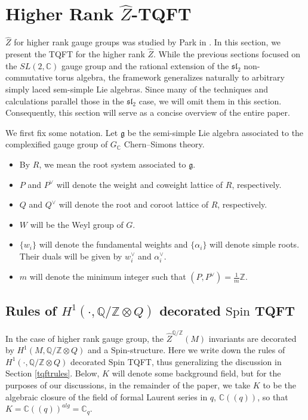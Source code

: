 \documentclass{article}
\newcommand{\Z}{{\mathbb Z}}
\newcommand{\C}{{\mathbb C}}
\newcommand{\Q}{{\mathbb Q}}
\numberwithin{corollary}{theorem}
\numberwithin{corollary}{proposition}
\begin{document}
\section{Higher Rank \texorpdfstring{$\hat{Z}$}{Z}-TQFT}
$\hat{Z}$ for higher rank gauge groups was studied by Park in \cite{P3}. In this section, we present the TQFT for the higher rank $\hat{Z}$. While the previous sections focused on the $SL(2,\C)$ gauge group and the rational extension of the $\mathfrak{sl}_2$ non-commutative torus algebra, the framework generalizes naturally to arbitrary simply laced sem-simple Lie algebras. Since many of the techniques and calculations parallel those in the $\mathfrak{sl}_{2}$ case, we will omit them in this section. Consequently, this section will serve as a concise overview of the entire paper. 

We first fix some notation. Let $\mathfrak{g}$ be the semi-simple Lie algebra associated to the complexified gauge group of $G_\mathbb{C}$ Chern--Simons theory. 
\begin{itemize}
    \item By $R$, we mean the root system associated to $\mathfrak{g}$.
    \item $P$ and $P^\vee$ will denote the weight and coweight lattice of $R$, respectively. 
    \item $Q$ and $Q^\vee$ will denote the root and coroot lattice of $R$, respectively.
    \item $W$ will be the Weyl group of $G$. 
    \item $\{w_i\}$ will denote the fundamental weights and $\{\alpha_i\}$ will denote simple roots. Their duals will be given by $w_i^\vee$ and $\alpha_i^\vee$. 
    \item $m$ will denote the minimum integer such that $(P,P^\vee) = \frac{1}{m}\mathbb{Z}$.
\end{itemize}

\subsection{Rules of \texorpdfstring{$H^{1}(\cdot, \Q/\Z \otimes Q )$}{H1(.,Q/ZxQ)} decorated \texorpdfstring{$\mathrm{Spin}$}{Spin} TQFT}


In the case of higher rank gauge group, the $\hat{Z}^{\Q/\Z}(M)$ invariants are decorated by $H^{1}(M,\Q/\Z \otimes Q)$ and a $\mathrm{Spin}$-structure. Here we write down the rules of $H^{1}(\cdot, \Q/\Z \otimes Q )$ decorated $\mathrm{Spin}$ TQFT, thus generalizing the discussion in Section \ref{tqftrules}. Below, $K$ will denote some background field, but for the purposes of our discussions, in the remainder of the paper, we take $K$ to be the algebraic closure of the field of formal Laurent series in $q$, $\mathbb{C}((q)) $, so that $K =\mathbb{C}((q))^{alg} = \C_q$.
\end{document}
